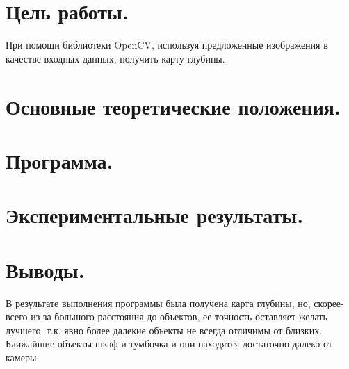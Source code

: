 \documentclass[14pt]{article}
\begin{document}
	
	
	\section{Цель работы.}
		При помощи библиотеки OpenCV, используя предложенные изображения в качестве входных данных, получить карту глубины.
	
	\section{Основные теоретические положения.}
		
	
	\section{Программа.}
		
		
	\section{Экспериментальные результаты.}
		

	\section{Выводы.}
		В результате выполнения программы была получена карта глубины, но, скорее-всего из-за большого расстояния до объектов, ее точность оставляет желать лучшего. т.к. явно более далекие объекты не всегда отличимы от близких. Ближайшие объекты шкаф и тумбочка и они находятся достаточно далеко от камеры.
\end{document}
